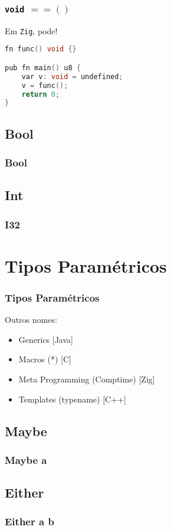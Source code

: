 \documentclass{beamer}
\newcommand{\lang}[1]{\texttt{#1}}
\newcommand{\inlcode}[1]{\texttt{#1}}
\begin{document}
\begin{frame}[fragile]
    \frametitle{\inlcode{void} \(== ()\)}
    Em \lang{Zig}, pode!
    \vfill
    \begin{lstlisting}[language=C]
fn func() void {}

pub fn main() u8 {
    var v: void = undefined;
    v = func();
    return 0;
}
    \end{lstlisting}
\end{frame}

\subsection{Bool}
\begin{frame}
    \frametitle{Bool}
\end{frame}

\subsection{Int}
\begin{frame}
    \frametitle{I32}
\end{frame}

\section{Tipos Paramétricos}
\begin{frame}
    \frametitle{Tipos Paramétricos}
    Outros nomes:
    \begin{itemize}
        \item Generics [Java]
        \item Macros (*) [C]
        \item Meta Programming (Comptime) [Zig]
        \item Templates (typename) [C++]
    \end{itemize}
\end{frame}

\subsection{Maybe}
\begin{frame}
    \frametitle{Maybe a}
\end{frame}

\subsection{Either}
\begin{frame}
    \frametitle{Either a b}
\end{frame}
\end{document}
